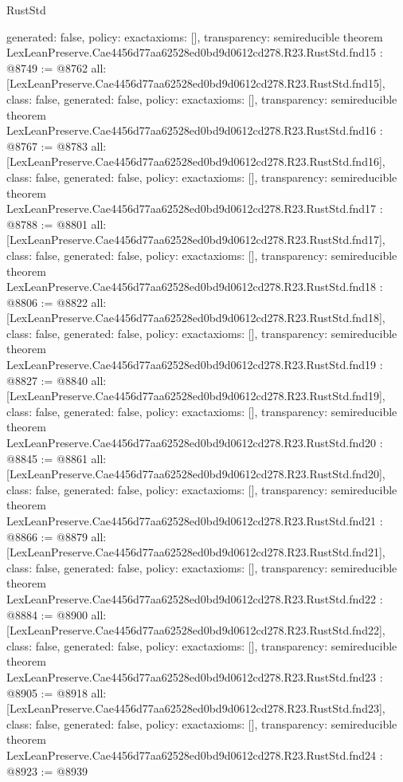 \begin{lexlean}{RustStd}
\begin{coremodule}
{  generated: false,
  policy: exact{axioms: []},
  transparency: semireducible
}
theorem LexLeanPreserve.Cae4456d77aa62528ed0bd9d0612cd278.R23.RustStd.fnd15 : @8749 := @8762 {
  all: [LexLeanPreserve.Cae4456d77aa62528ed0bd9d0612cd278.R23.RustStd.fnd15],
  class: false,
  generated: false,
  policy: exact{axioms: []},
  transparency: semireducible
}
theorem LexLeanPreserve.Cae4456d77aa62528ed0bd9d0612cd278.R23.RustStd.fnd16 : @8767 := @8783 {
  all: [LexLeanPreserve.Cae4456d77aa62528ed0bd9d0612cd278.R23.RustStd.fnd16],
  class: false,
  generated: false,
  policy: exact{axioms: []},
  transparency: semireducible
}
theorem LexLeanPreserve.Cae4456d77aa62528ed0bd9d0612cd278.R23.RustStd.fnd17 : @8788 := @8801 {
  all: [LexLeanPreserve.Cae4456d77aa62528ed0bd9d0612cd278.R23.RustStd.fnd17],
  class: false,
  generated: false,
  policy: exact{axioms: []},
  transparency: semireducible
}
theorem LexLeanPreserve.Cae4456d77aa62528ed0bd9d0612cd278.R23.RustStd.fnd18 : @8806 := @8822 {
  all: [LexLeanPreserve.Cae4456d77aa62528ed0bd9d0612cd278.R23.RustStd.fnd18],
  class: false,
  generated: false,
  policy: exact{axioms: []},
  transparency: semireducible
}
theorem LexLeanPreserve.Cae4456d77aa62528ed0bd9d0612cd278.R23.RustStd.fnd19 : @8827 := @8840 {
  all: [LexLeanPreserve.Cae4456d77aa62528ed0bd9d0612cd278.R23.RustStd.fnd19],
  class: false,
  generated: false,
  policy: exact{axioms: []},
  transparency: semireducible
}
theorem LexLeanPreserve.Cae4456d77aa62528ed0bd9d0612cd278.R23.RustStd.fnd20 : @8845 := @8861 {
  all: [LexLeanPreserve.Cae4456d77aa62528ed0bd9d0612cd278.R23.RustStd.fnd20],
  class: false,
  generated: false,
  policy: exact{axioms: []},
  transparency: semireducible
}
theorem LexLeanPreserve.Cae4456d77aa62528ed0bd9d0612cd278.R23.RustStd.fnd21 : @8866 := @8879 {
  all: [LexLeanPreserve.Cae4456d77aa62528ed0bd9d0612cd278.R23.RustStd.fnd21],
  class: false,
  generated: false,
  policy: exact{axioms: []},
  transparency: semireducible
}
theorem LexLeanPreserve.Cae4456d77aa62528ed0bd9d0612cd278.R23.RustStd.fnd22 : @8884 := @8900 {
  all: [LexLeanPreserve.Cae4456d77aa62528ed0bd9d0612cd278.R23.RustStd.fnd22],
  class: false,
  generated: false,
  policy: exact{axioms: []},
  transparency: semireducible
}
theorem LexLeanPreserve.Cae4456d77aa62528ed0bd9d0612cd278.R23.RustStd.fnd23 : @8905 := @8918 {
  all: [LexLeanPreserve.Cae4456d77aa62528ed0bd9d0612cd278.R23.RustStd.fnd23],
  class: false,
  generated: false,
  policy: exact{axioms: []},
  transparency: semireducible
}
theorem LexLeanPreserve.Cae4456d77aa62528ed0bd9d0612cd278.R23.RustStd.fnd24 : @8923 := @8939 {
}
\end{coremodule}
\end{lexlean}
